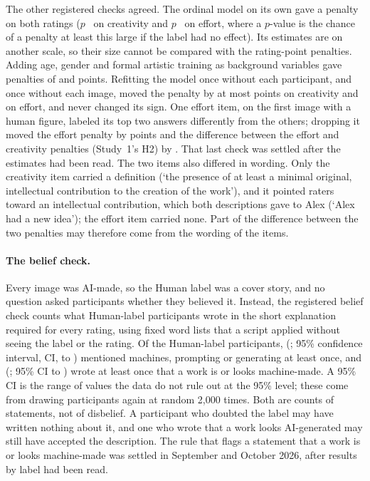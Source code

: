 The other registered checks agreed. The ordinal model on its own gave a penalty on both ratings ($p$~\SOneOrdCreatP{} on creativity and $p$~\SOneOrdEffP{} on effort, where a $p$-value is the chance of a penalty at least this large if the label had no effect). Its estimates are on another scale, so their size cannot be compared with the rating-point penalties. Adding age, gender and formal artistic training as background variables gave penalties of \SOneCovCreat{} and \SOneCovEff{} points. Refitting the model once without each participant, and once without each image, moved the penalty by at most \SOneInfluenceCreatImage{} points on creativity and \SOneInfluenceEffPerson{} on effort, and never changed its sign. One effort item, on the first image with a human figure, labeled its top two answers differently from the others; dropping it moved the effort penalty by \SOneItemHOneEffShift{} points and the difference between the effort and creativity penalties (Study~1's H2) by \SOneItemHTwoShift. That last check was settled after the estimates had been read. The two items also differed in wording. Only the creativity item carried a definition (`the presence of at least a minimal original, intellectual contribution to the creation of the work'), and it pointed raters toward an intellectual contribution, which both descriptions gave to Alex (`Alex had a new idea'); the effort item carried none. Part of the difference between the two penalties may therefore come from the wording of the items.

\paragraph*{The belief check.}
Every image was AI-made, so the Human label was a cover story, and no question asked participants whether they believed it. Instead, the registered belief check counts what Human-label participants wrote in the short explanation required for every rating, using fixed word lists that a script applied without seeing the label or the rating. Of the \SOneBeliefNHuman{} Human-label participants, \SOneBeliefBroadN{} (\SOneBeliefBroadPct; 95\% confidence interval, CI, \SOneBeliefBroadLoPct{} to \SOneBeliefBroadHiPct) mentioned machines, prompting or generating at least once, and \SOneBeliefNarrowN{} (\SOneBeliefNarrowPct; 95\% CI \SOneBeliefNarrowLoPct{} to \SOneBeliefNarrowHiPct) wrote at least once that a work is or looks machine-made. A 95\% CI is the range of values the data do not rule out at the 95\% level; these come from drawing participants again at random 2,000 times. Both are counts of statements, not of disbelief. A participant who doubted the label may have written nothing about it, and one who wrote that a work looks AI-generated may still have accepted the description. The rule that flags a statement that a work is or looks machine-made was settled in September and October 2026, after results by label had been read.

